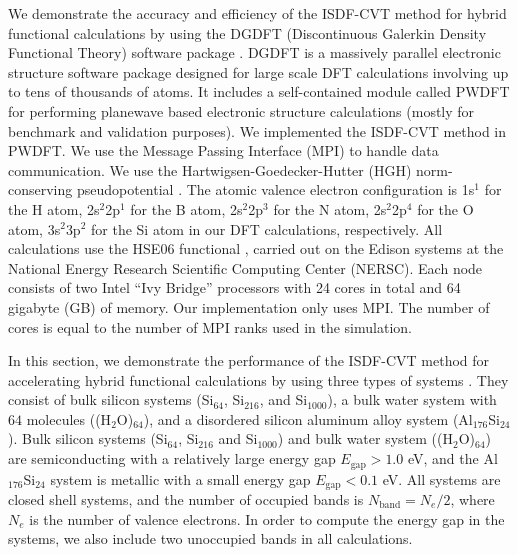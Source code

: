We demonstrate the accuracy and efficiency of the ISDF-CVT method for hybrid
functional calculations by using the DGDFT (Discontinuous Galerkin Density
Functional Theory) software package \cite{JCP_231_2140_2012_DGDFT,
JCP_143_124110_2015_DGDFT,PCCP_17_31397_2015_DGDFT, JCP_145_154101_2016_DGDFT,
JCP_335_426_2017_DGDFT}. DGDFT is a massively parallel electronic structure
software package designed for large scale DFT calculations involving up to tens
of thousands of atoms. It includes a self-contained module called PWDFT for
performing planewave based electronic structure calculations (mostly for
benchmark and validation purposes). We implemented the ISDF-CVT method in PWDFT.
We use the Message Passing Interface (MPI) to handle data communication. We use
the Hartwigsen-Goedecker-Hutter (HGH) norm-conserving pseudopotential
\cite{PRB_58_3641_1998_HGH}. The atomic valence electron configuration is 1s$^1$
for the H atom, 2s$^2$2p$^1$ for the B atom, 2s$^2$2p$^3$ for the N atom,
2s$^2$2p$^4$ for the O atom, 3s$^2$3p$^2$ for the Si atom in our DFT
calculations, respectively. All calculations use the HSE06 functional 
\cite{JCP_124_219906_2006_HSE06}, carried out on the Edison systems at the
National Energy Research Scientific Computing Center (NERSC). Each node consists
of two Intel ``Ivy Bridge'' processors with 24 cores in total and 64 gigabyte 
(GB) of memory. Our implementation only uses MPI. The number of cores is equal
to the number of MPI ranks used in the simulation.


In this section, we demonstrate the performance of the ISDF-CVT method for
accelerating hybrid functional calculations by using three types of systems 
\cite{JCTC_2017_PCDIIS}. They consist of bulk silicon systems (Si$_{64}$, Si$_
{216}$, and Si$_{1000}$), a bulk water system with $64$ molecules ((H$_2$O)$_
{64}$), and a disordered silicon aluminum alloy system (Al$_{176}$Si$_{24}$).
Bulk silicon systems (Si$_{64}$, Si$_{216}$ and Si$_{1000}$) and bulk water
system ((H$_2$O)$_{64}$) are semiconducting with a relatively large energy gap
$E_\text{gap} > 1.0$ eV, and the Al$_{176}$Si$_{24}$ system is metallic with a
small energy gap $E_\text{gap} < 0.1$ eV. All systems are closed shell systems,
and the number of occupied bands is $N_\text{band} = N_{e}/2$, where $N_e$ is
the number of valence electrons. In order to compute the energy gap in the
systems, we also include two unoccupied bands in all calculations.


\subsection{}
\label{c5subsec:accuracy}

